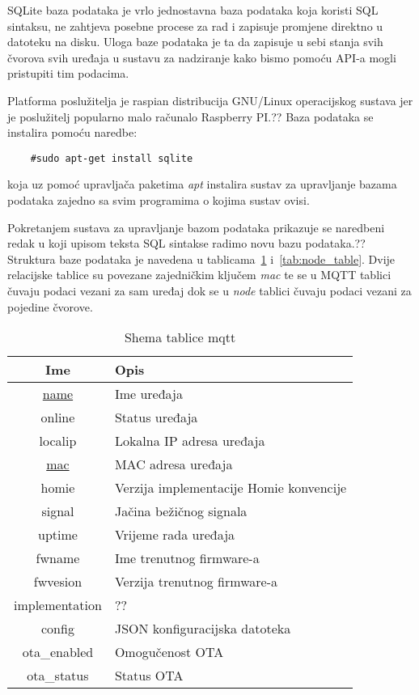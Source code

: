 \documentclass[times, utf8, zavrsni]{fer}
\begin{document}
{SQLite baza podataka je vrlo jednostavna baza podataka koja koristi SQL sintaksu, ne zahtjeva posebne procese za rad i zapisuje promjene direktno u datoteku na disku.
Uloga baze podataka je ta da zapisuje u sebi stanja svih čvorova svih uređaja u sustavu za nadziranje kako bismo pomoću API-a mogli pristupiti tim podacima.

Platforma poslužitelja je raspian distribucija GNU/Linux operacijskog sustava jer je poslužitelj popularno malo računalo Raspberry PI.??
Baza podataka se instalira pomoću naredbe:
\begin{lstlisting}
    #sudo apt-get install sqlite
\end{lstlisting}
koja uz pomoć upravljača paketima \textit{apt} instalira sustav za upravljanje bazama podataka zajedno sa svim programima o kojima sustav ovisi.

Pokretanjem sustava za upravljanje bazom podataka prikazuje se naredbeni redak u koji upisom teksta SQL sintakse radimo novu
bazu podataka.??
Struktura baze podataka je navedena u tablicama~\ref{tab:mqtt_table} i~\ref{tab:node_table}.
Dvije relacijske tablice su povezane zajedničkim ključem \textit{mac} te se u MQTT tablici čuvaju podaci vezani za sam uređaj dok se u \textit{node} tablici čuvaju podaci vezani za pojedine čvorove.
\begin{table}[H]
    \centering
    \begin{tabular}{ |c|l| }
        \hline
        Ime & Opis \\
        \hline
        \underline{name} & Ime uređaja\\
        \hline
        online & Status uređaja\\
        \hline
        localip & Lokalna IP adresa uređaja\\
        \hline
        \underline{mac} & MAC adresa uređaja\\
        \hline
        homie & Verzija implementacije Homie konvencije\\
        \hline
        signal & Jačina bežičnog signala\\
        \hline
        uptime & Vrijeme rada uređaja\\
        \hline
        fwname & Ime trenutnog firmware-a\\
        \hline
        fwvesion & Verzija trenutnog firmware-a\\
        \hline
        implementation & ??\\
        \hline
        config & JSON konfiguracijska datoteka\\
        \hline
        ota\_enabled & Omogučenost OTA\\
        \hline
        ota\_status & Status OTA\\
        \hline
    \end{tabular}
    \caption{Shema tablice mqtt}\label{tab:mqtt_table}
\end{table}

}
\end{document}

